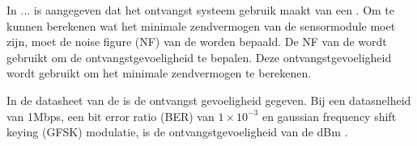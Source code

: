 





In ... is aangegeven dat het ontvangst systeem gebruik maakt van een \mcu. Om te kunnen berekenen wat het minimale zendvermogen van de sensormodule moet zijn, moet de noise figure (NF) van de \mcu worden bepaald. De NF van de \mcu wordt gebruikt om de ontvangstgevoeligheid te bepalen. Deze ontvangstgevoeligheid wordt gebruikt om het minimale zendvermogen te berekenen.

In de datasheet van de \mcu is de ontvangst gevoeligheid gegeven. Bij een datasnelheid van 1Mbps, een bit error ratio (BER) van  $1 \times 10^{-3}$ en gaussian frequency shift keying (GFSK) modulatie, is de ontvangstgevoeligheid van de  dBm \cite{dsNrf52810}.

